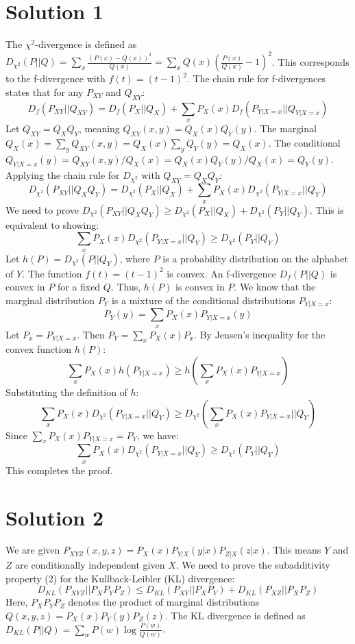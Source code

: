 \documentclass{article}
\begin{document}
\section*{Solution 1}
The $\chi^2$-divergence is defined as $D_{\chi^2}(P || Q) = \sum_x \frac{(P(x) - Q(x))^2}{Q(x)} = \sum_x Q(x) \left( \frac{P(x)}{Q(x)} - 1 \right)^2$.
This corresponds to the f-divergence with $f(t) = (t-1)^2$.
The chain rule for f-divergences states that for any $P_{XY}$ and $Q_{XY}$:
\[ D_f(P_{XY} || Q_{XY}) = D_f(P_X || Q_X) + \sum_x P_X(x) D_f(P_{Y|X=x} || Q_{Y|X=x}) \]
Let $Q_{XY} = Q_X Q_Y$, meaning $Q_{XY}(x,y) = Q_X(x) Q_Y(y)$. The marginal $Q_X(x) = \sum_y Q_{XY}(x,y) = Q_X(x) \sum_y Q_Y(y) = Q_X(x)$. The conditional $Q_{Y|X=x}(y) = Q_{XY}(x,y) / Q_X(x) = Q_X(x) Q_Y(y) / Q_X(x) = Q_Y(y)$.
Applying the chain rule for $D_{\chi^2}$ with $Q_{XY} = Q_X Q_Y$:
\[ D_{\chi^2}(P_{XY} || Q_X Q_Y) = D_{\chi^2}(P_X || Q_X) + \sum_x P_X(x) D_{\chi^2}(P_{Y|X=x} || Q_Y) \]
We need to prove $D_{\chi^2}(P_{XY} || Q_X Q_Y) \ge D_{\chi^2}(P_X || Q_X) + D_{\chi^2}(P_Y || Q_Y)$.
This is equivalent to showing:
\[ \sum_x P_X(x) D_{\chi^2}(P_{Y|X=x} || Q_Y) \ge D_{\chi^2}(P_Y || Q_Y) \]
Let $h(P) = D_{\chi^2}(P || Q_Y)$, where $P$ is a probability distribution on the alphabet of $Y$. The function $f(t) = (t-1)^2$ is convex. An f-divergence $D_f(P || Q)$ is convex in $P$ for a fixed $Q$. Thus, $h(P)$ is convex in $P$.
We know that the marginal distribution $P_Y$ is a mixture of the conditional distributions $P_{Y|X=x}$:
\[ P_Y(y) = \sum_x P_X(x) P_{Y|X=x}(y) \]
Let $P_x = P_{Y|X=x}$. Then $P_Y = \sum_x P_X(x) P_x$.
By Jensen's inequality for the convex function $h(P)$:
\[ \sum_x P_X(x) h(P_{Y|X=x}) \ge h\left( \sum_x P_X(x) P_{Y|X=x} \right) \]
Substituting the definition of $h$:
\[ \sum_x P_X(x) D_{\chi^2}(P_{Y|X=x} || Q_Y) \ge D_{\chi^2}\left( \sum_x P_X(x) P_{Y|X=x} || Q_Y \right) \]
Since $\sum_x P_X(x) P_{Y|X=x} = P_Y$, we have:
\[ \sum_x P_X(x) D_{\chi^2}(P_{Y|X=x} || Q_Y) \ge D_{\chi^2}(P_Y || Q_Y) \]
This completes the proof.

\section*{Solution 2}
We are given $P_{XYZ}(x,y,z) = P_X(x) P_{Y|X}(y|x) P_{Z|X}(z|x)$. This means $Y$ and $Z$ are conditionally independent given $X$.
We need to prove the subadditivity property (2) for the Kullback-Leibler (KL) divergence:
\[ D_{KL}(P_{XYZ} || P_X P_Y P_Z) \le D_{KL}(P_{XY} || P_X P_Y) + D_{KL}(P_{XZ} || P_X P_Z) \]
Here, $P_X P_Y P_Z$ denotes the product of marginal distributions $Q(x,y,z) = P_X(x) P_Y(y) P_Z(z)$.
The KL divergence is defined as $D_{KL}(P||Q) = \sum_w P(w) \log \frac{P(w)}{Q(w)}$.
\end{document}

